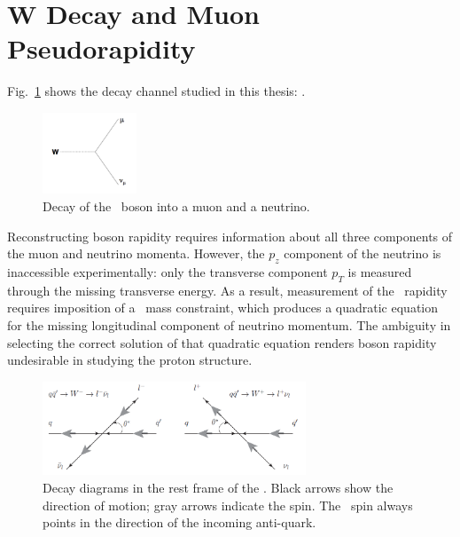 \section{W Decay and Muon Pseudorapidity}

Fig.~\ref{fig:theory:decay} shows the decay channel studied in this thesis: \Wmn.

\begin{figure}[phtb]
  \begin{center}
    \includegraphics[width=0.25\textwidth]{theory/fig/decay}
    \caption{ Decay of the \Wboson\ boson into a muon and a neutrino.}
    \label{fig:theory:decay}
 \end{center}
\end{figure}

Reconstructing boson rapidity requires information about all three components of the muon and neutrino momenta. However, the $p_z$ component of the neutrino is inaccessible experimentally: only the transverse component $p_T$ is measured through the missing transverse energy. As a result, measurement of the \Wboson\ rapidity requires imposition of a \Wboson\ mass constraint, which produces a quadratic equation for the missing longitudinal component of neutrino momentum. The ambiguity in selecting the correct solution of that quadratic equation renders boson rapidity undesirable in studying the proton structure.

\begin{figure}[phtb]
  \begin{center}
    \includegraphics[width=0.7\textwidth]{theory/fig/VA}
    \caption{ Decay diagrams in the rest frame of the \Wboson. Black arrows show the direction of motion; gray arrows indicate the spin. The \Wboson\ spin always points in the direction of the incoming anti-quark.}
    \label{fig:theory:va}
 \end{center}
\end{figure}


